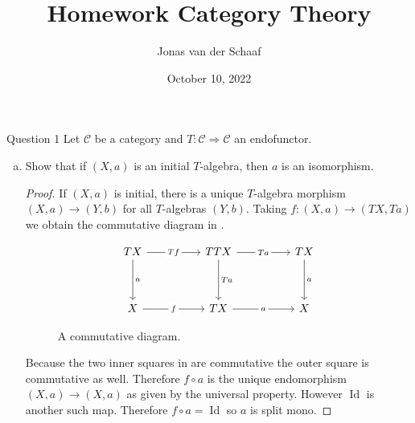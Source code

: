 \documentclass{article}
\title{Homework Category Theory}
\author{Jonas van der Schaaf}
\date{October 10, 2022}
\DeclareMathOperator{\Id}{Id}
\newcommand{\cat}{\mathcal{C}}
\newenvironment{question}[1][]{\begin{paragraph}{Question #1}}{\end{paragraph}}
\theoremstyle{definition}
\begin{document}
\maketitle

\begin{question}[1]
    Let \(\cat\) be a category and \(T:\cat\Rightarrow\cat\) an endofunctor.

    \begin{enumerate}[(a)]
        \item Show that if \((X,a)\) is an initial \(T\)-algebra, then \(a\) is
              an isomorphism.

              \begin{proof}
                  If \((X,a)\) is initial, there is a unique \(T\)-algebra
                  morphism \((X,a)\to(Y,b)\) for all \(T\)-algebras \((Y,b)\).
                  Taking \(f:(X,a)\to(TX,Ta)\) we obtain the commutative diagram
                  in .
                  \begin{figure}[H]
                      \[
                          \begin{tikzcd}[ampersand replacement=\&]
                              TX \&\& TTX \&\& TX \\
                              \\
                              X \&\& TX \&\& X
                              \arrow["Ta", from=1-3, to=3-3]
                              \arrow["a", from=1-5, to=3-5]
                              \arrow["a"{description}, from=3-3, to=3-5]
                              \arrow["Ta"{description}, from=1-3, to=1-5]
                              \arrow["Tf"{description}, from=1-1, to=1-3]
                              \arrow["a", from=1-1, to=3-1]
                              \arrow["f"{description}, from=3-1, to=3-3]
                          \end{tikzcd}
                      \]
                      \caption{A commutative diagram.}
                      \label{fig:init-obj-iso}
                  \end{figure}
                  Because the two inner squares in  are
                  commutative the outer square is commutative as well. Therefore
                  \(f\circ a\) is the unique endomorphism \((X,a)\to(X,a)\) as
                  given by the universal property. However \(\Id\) is another
                  such map. Therefore \(f\circ a=\Id\) so \(a\) is split mono.


\end{proof}
\end{enumerate}
\end{question}
\end{document}
